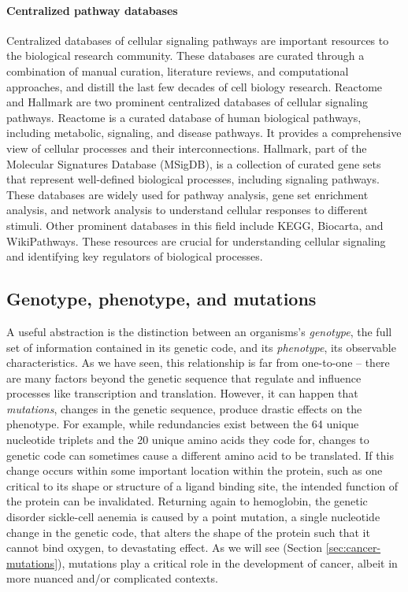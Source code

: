 \paragraph{Centralized pathway databases}
Centralized databases of cellular signaling pathways are important resources to the biological research community.
These databases are curated through a combination of manual curation, literature reviews, and computational approaches, and distill the last few decades of cell biology research.
Reactome and Hallmark are two prominent centralized databases of cellular signaling pathways.
Reactome is a curated database of human biological pathways, including metabolic, signaling, and disease pathways.
It provides a comprehensive view of cellular processes and their interconnections.
Hallmark, part of the Molecular Signatures Database (MSigDB), is a collection of curated gene sets that represent well-defined biological processes, including signaling pathways.
These databases are widely used for pathway analysis, gene set enrichment analysis, and network analysis to understand cellular responses to different stimuli.
Other prominent databases in this field include KEGG, Biocarta, and WikiPathways.
These resources are crucial for understanding cellular signaling and identifying key regulators of biological processes.

\subsection{Genotype, phenotype, and mutations}
A useful abstraction is the distinction between an organisms's \emph{genotype}, the full set of information contained in its genetic code, and its \emph{phenotype}, its observable characteristics.
As we have seen, this relationship is far from one-to-one -- there are many factors beyond the genetic sequence that regulate and influence processes like transcription and translation.
However, it can happen that \emph{mutations}, changes in the genetic sequence, produce drastic effects on the phenotype.
For example, while redundancies exist between the 64 unique nucleotide triplets and the 20 unique amino acids they code for, changes to genetic code can sometimes cause a different amino acid to be translated.
If this change occurs within some important location within the protein, such as one critical to its shape or structure of a ligand binding site, the intended function of the protein can be invalidated.
Returning again to hemoglobin, the genetic disorder sickle-cell aenemia is caused by a point mutation, a single nucleotide change in the genetic code, that alters the shape of the protein such that it cannot bind oxygen, to devastating effect.
As we will see (Section \ref{sec:cancer-mutations}), mutations play a critical role in the development of cancer, albeit in more nuanced and/or complicated contexts.

